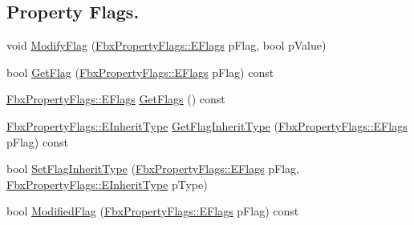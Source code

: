 \subsection*{Property Flags.}
\begin{DoxyCompactItemize}
\item 
void \hyperlink{class_fbx_property_a16da0381546978afc477b033239f1fc9}{Modify\+Flag} (\hyperlink{class_fbx_property_flags_afabfa7e0949aac8a7dcdf8a141867e99}{Fbx\+Property\+Flags\+::\+E\+Flags} p\+Flag, bool p\+Value)
\item 
bool \hyperlink{class_fbx_property_a08c9fefe4d1a34c091ff02386462c8d6}{Get\+Flag} (\hyperlink{class_fbx_property_flags_afabfa7e0949aac8a7dcdf8a141867e99}{Fbx\+Property\+Flags\+::\+E\+Flags} p\+Flag) const
\item 
\hyperlink{class_fbx_property_flags_afabfa7e0949aac8a7dcdf8a141867e99}{Fbx\+Property\+Flags\+::\+E\+Flags} \hyperlink{class_fbx_property_a8a6c56ee1afdaac4fd6d750a6677f177}{Get\+Flags} () const
\item 
\hyperlink{class_fbx_property_flags_ae3b667a4fcac4b827fa186a698fec2f8}{Fbx\+Property\+Flags\+::\+E\+Inherit\+Type} \hyperlink{class_fbx_property_ad2c773361ba216ae0fdd3eb8d10cb4e2}{Get\+Flag\+Inherit\+Type} (\hyperlink{class_fbx_property_flags_afabfa7e0949aac8a7dcdf8a141867e99}{Fbx\+Property\+Flags\+::\+E\+Flags} p\+Flag) const
\item 
bool \hyperlink{class_fbx_property_a65a521dab6bcd5c3f2570f555dbcaddc}{Set\+Flag\+Inherit\+Type} (\hyperlink{class_fbx_property_flags_afabfa7e0949aac8a7dcdf8a141867e99}{Fbx\+Property\+Flags\+::\+E\+Flags} p\+Flag, \hyperlink{class_fbx_property_flags_ae3b667a4fcac4b827fa186a698fec2f8}{Fbx\+Property\+Flags\+::\+E\+Inherit\+Type} p\+Type)
\item 
bool \hyperlink{class_fbx_property_ab89605d755ba9030d8a03819741dbafb}{Modified\+Flag} (\hyperlink{class_fbx_property_flags_afabfa7e0949aac8a7dcdf8a141867e99}{Fbx\+Property\+Flags\+::\+E\+Flags} p\+Flag) const
\end{DoxyCompactItemize}
